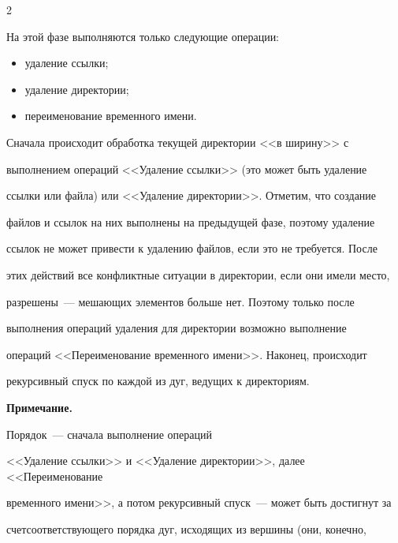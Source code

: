 \begin{multicols}{2}
      


      На этой фазе выполняются только следующие операции:


      \begin{itemize}


\item удаление ссылки;


\item удаление директории;


\item переименование временного имени.


\end{itemize}





      Сначала происходит обработка текущей директории <<в ширину>> с 


выполнением операций <<Удаление ссылки>> (это может быть удаление 


ссылки или файла) или <<Удаление директории>>. Отметим, что создание 


файлов и ссылок на них выполнены на предыдущей фазе, поэтому удаление 


ссылок не может привести к удалению файлов, если это не требуется. После 


этих действий все конфликтные ситуации в директории, если они имели место, 


разрешены~---  мешающих элементов больше нет. Поэтому только после 


выполнения операций удаления для директории возможно выполнение 


операций <<Переименование временного имени>>. Наконец, происходит 


рекурсивный спуск по каждой из дуг, ведущих к директориям.


      


      \smallskip


      


      \noindent


{\sf      \textbf{Примечание.} 


Порядок~--- сначала выполнение операций 


<<Удаление ссылки>> и <<Удаление директории>>, далее <<Переименование 


временного имени>>, а потом рекурсивный спуск~--- может быть достигнут за 


счет\linebreak соответствующего порядка дуг, исходящих из вершины (они, конечно, 


}
\end{multicols}
